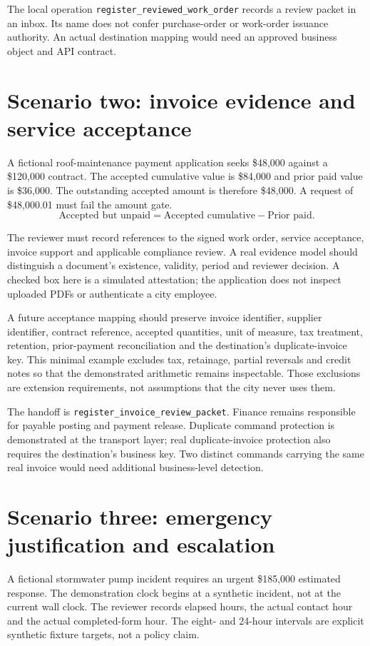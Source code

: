\documentclass[11pt,letterpaper]{article}
\newcommand{\code}[1]{\texttt{\small #1}}
\begin{document}
The local operation \code{register\_reviewed\_work\_order} records a review packet in an inbox. Its name does not confer purchase-order or work-order issuance authority. An actual destination mapping would need an approved business object and API contract.

\section{Scenario two: invoice evidence and service acceptance}
A fictional roof-maintenance payment application seeks \$48,000 against a \$120,000 contract. The accepted cumulative value is \$84,000 and prior paid value is \$36,000. The outstanding accepted amount is therefore \$48,000. A request of \$48,000.01 must fail the amount gate.
\[
\text{Accepted but unpaid}=\text{Accepted cumulative}-\text{Prior paid}.
\]

The reviewer must record references to the signed work order, service acceptance, invoice support and applicable compliance review. A real evidence model should distinguish a document's existence, validity, period and reviewer decision. A checked box here is a simulated attestation; the application does not inspect uploaded PDFs or authenticate a city employee.

A future acceptance mapping should preserve invoice identifier, supplier identifier, contract reference, accepted quantities, unit of measure, tax treatment, retention, prior-payment reconciliation and the destination's duplicate-invoice key. This minimal example excludes tax, retainage, partial reversals and credit notes so that the demonstrated arithmetic remains inspectable. Those exclusions are extension requirements, not assumptions that the city never uses them.

The handoff is \code{register\_invoice\_review\_packet}. Finance remains responsible for payable posting and payment release. Duplicate command protection is demonstrated at the transport layer; real duplicate-invoice protection also requires the destination's business key. Two distinct commands carrying the same real invoice would need additional business-level detection.

\section{Scenario three: emergency justification and escalation}
A fictional stormwater pump incident requires an urgent \$185,000 estimated response. The demonstration clock begins at a synthetic incident, not at the current wall clock. The reviewer records elapsed hours, the actual contact hour and the actual completed-form hour. The eight- and 24-hour intervals are explicit synthetic fixture targets, not a policy claim.
\end{document}
